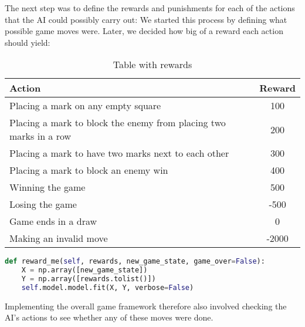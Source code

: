 The next step was to define the rewards and punishments for each of the actions that the AI could possibly carry out: We started this process by defining what possible game moves were. Later, we decided how big of a reward each action should yield:

\begin{table}[H]
	\begin{tabular}{|l|c|}\hline
		Action & Reward \\ \hline \hline
		Placing a mark on any empty square & 100 \\ \hline
		Placing a mark to block the enemy from placing two marks in a row & 200 \\ \hline
		Placing a mark to have two marks next to each other & 300 \\ \hline
		Placing a mark to block an enemy win & 400 \\ \hline
		Winning the game & 500 \\ \hline
		Losing the game & -500 \\ \hline
		Game ends in a draw & 0 \\ \hline
		Making an invalid move & -2000 \\ \hline
	\end{tabular}
	\caption{Table with rewards}
	\label{tablRewards}
\end{table}


\begin{lstlisting}[frame=single,language=Python,caption={Method of },captionpos=b]
def reward_me(self, rewards, new_game_state, game_over=False):
    X = np.array([new_game_state])
    Y = np.array([rewards.tolist()])
    self.model.model.fit(X, Y, verbose=False)
\end{lstlisting}

Implementing the overall game framework therefore also involved checking the AI's actions to see whether any of these moves were done.